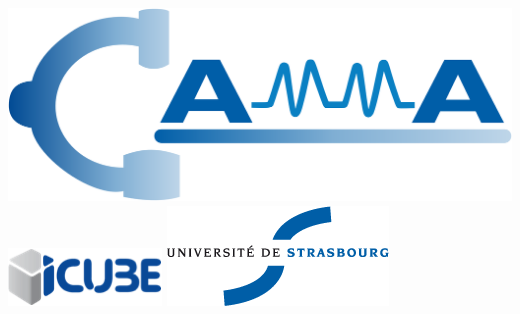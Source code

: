 \documentclass[final,hyperref={pdfpagelabels=false}]{beamer}
\begin{document}
\begin{frame}[t]
\begin{columns}[t]
\begin{column}{.465\textwidth}
\end{column} %

\begin{column}{.015\textwidth}\end{column} %

\end{columns} %

\begin{center}
\includegraphics[scale=0.07]{figures/camma_logo_tr}\vspace{50 mm}
\includegraphics[scale=4]{figures/icube}\vspace{50 mm}
\includegraphics[scale=1]{figures/unistraTransparent}
\end{center}

\end{frame} %
\end{document}
